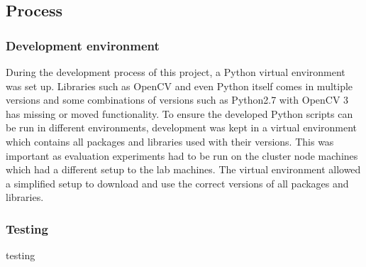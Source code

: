 \subsection{Process}

\subsubsection{Development environment}
During the development process of this project, a Python virtual environment was set up. Libraries such as OpenCV and even Python itself comes in multiple versions and some combinations of versions such as Python2.7 with OpenCV 3 has missing or moved functionality. To ensure the developed Python scripts can be run in different environments, development was kept in a virtual environment which contains all packages and libraries used with their versions. This was important as evaluation experiments had to be run on the cluster node machines which had a different setup to the lab machines. The virtual environment allowed a simplified setup to download and use the correct versions of all packages and libraries.

\subsubsection{Testing}
testing


